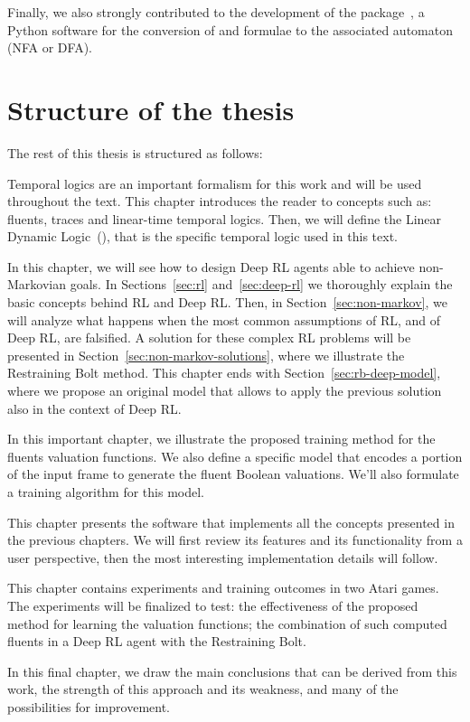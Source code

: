 Finally, we also strongly contributed to the development of the 
package~\cite{bib:flloat}, a Python software for the conversion of \ltl{} and
\ldl{} formulae to the associated automaton (NFA or DFA).


\section{Structure of the thesis}

The rest of this thesis is structured as follows:
\begin{description}[style=nextline]
	\item[\ref{ch:logics}~--~\nameref{ch:logics}]
		Temporal logics are an important formalism for this work and will be used
		throughout the text. This chapter introduces the reader to concepts such
		as: fluents, traces and linear-time temporal logics. Then, we will define
		the Linear Dynamic Logic~(\ldl{}), that is the specific temporal logic
		used in this text.
	\item[\ref{ch:rl}~--~\nameref{ch:rl}]
		In this chapter, we will see how to design Deep RL agents able to achieve
		non-Markovian goals. In Sections~\ref{sec:rl} and~\ref{sec:deep-rl} we
		thoroughly explain the basic concepts behind RL and Deep RL. Then, in
		Section~\ref{sec:non-markov}, we will analyze what happens when the most
		common assumptions of RL, and of Deep RL, are falsified.  A solution for
		these complex RL problems will be presented in
		Section~\ref{sec:non-markov-solutions}, where we illustrate the
		Restraining Bolt method.  This chapter ends with
		Section~\ref{sec:rb-deep-model}, where we propose an original model that
		allows to apply the previous solution also in the context of Deep RL.
	\item[\ref{ch:fluents}~--~\nameref{ch:fluents}]
		In this important chapter, we illustrate the proposed training method for
		the fluents valuation functions. We also define a specific model that
		encodes a portion of the input frame to generate the fluent Boolean
		valuations.  We'll also formulate a training algorithm for this model.
	\item[\ref{ch:atarieyes}~--~\nameref{ch:atarieyes}]
		This chapter presents the software that implements all the concepts
		presented in the previous chapters. We will first review its features and
		its functionality from a user perspective, then the most interesting
		implementation details will follow.
	\item[\ref{ch:experiments}~--~\nameref{ch:experiments}]
		This chapter contains experiments and training outcomes in two Atari
		games. The experiments will be finalized to test: the effectiveness of the
		proposed method for learning the valuation functions; the combination of
		such computed fluents in a Deep RL agent with the Restraining Bolt.
	\item[\ref{ch:conclusions}~--~\nameref{ch:conclusions}]
		In this final chapter, we draw the main conclusions that can be derived
		from this work, the strength of this approach and its weakness, and many
		of the possibilities for improvement.
\end{description}

